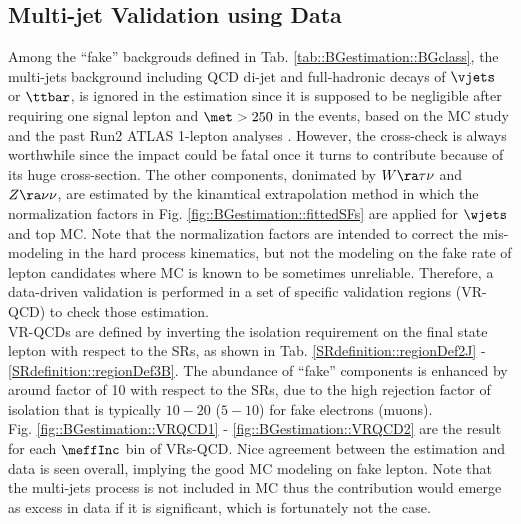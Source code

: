 \subsection{Multi-jet Validation using Data} \label{sec::BGestimation::VRQCD}
Among the ``fake'' backgrouds defined in Tab. \ref{tab::BGestimation::BGclass}, 
the multi-jets background including QCD di-jet and full-hadronic decays of $\vjets$ or $\ttbar$, is ignored in the estimation since it is supposed to be negligible after requiring one signal lepton and $\met>250$ in the events, based on the MC study and the past Run2 ATLAS 1-lepton analyses \cite{strong1L_3p2fb_paper}\cite{strong1L_ICHEP2016_CONF}.
However, the cross-check is always worthwhile since the impact could be fatal once it turns to contribute because of its huge cross-section. 
The other components, donimated by $W\ra\tau\nu$ and $Z\ra\nu\nu$, are estimated by the kinamtical extrapolation method in which the normalization factors in Fig. \ref{fig::BGestimation::fittedSFs} are applied for $\wjets$ and top MC. Note that the normalization factors are intended to correct the mis-modeling in the hard process kinematics, but not the modeling on the fake rate of lepton candidates where MC is known to be sometimes unreliable. 
Therefore, a data-driven validation is performed in a set of specific validation regions (VR-QCD) to check those estimation. \\

VR-QCDs are defined by inverting the isolation requirement on the final state lepton with respect to the SRs, as shown in Tab. \ref{SRdefinition::regionDef2J} - \ref{SRdefinition::regionDef3B}. 
The abundance of ``fake'' components is enhanced by around factor of 10 with respect to the SRs, due to the high rejection factor of isolation that is typically $10-20$ ($5-10$) for fake electrons (muons). \\

Fig. \ref{fig::BGestimation::VRQCD1} - \ref{fig::BGestimation::VRQCD2} are the result for each $\meffInc$ bin of VRs-QCD. Nice agreement between the estimation and data is seen overall, implying the good MC modeling on fake lepton. Note that the multi-jets process is not included in MC thus the contribution would emerge as excess in data if it is significant, which is fortunately not the case. \\

